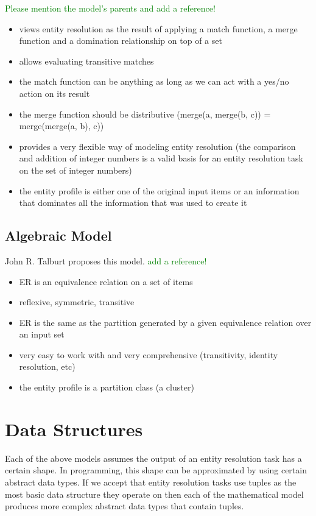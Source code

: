 \documentclass[11pt]{article}
\begin{document}
    \textcolor{green}{Please mention the model's parents and add a reference!}
    \begin{itemize}
        \item views entity resolution as the result of applying a match function, a merge function and a domination relationship on top of a set
        \item allows evaluating transitive matches
        \item the match function can be anything as long as we can act with a yes/no action on its result
        \item the merge function should be distributive (merge(a, merge(b, c)) = merge(merge(a, b), c))
        \item provides a very flexible way of modeling entity resolution (the comparison and addition of integer numbers is a valid basis for an entity resolution task on the set of integer numbers)
        \item the entity profile is either one of the original input items or an information that dominates all the information that was used to create it
    \end{itemize}

    \subsection[algebraic]{Algebraic Model}\label{subsec:algebraic}

    John R. Talburt proposes this model. 
    \textcolor{green}{add a reference!}
    \begin{itemize}
        \item ER is an equivalence relation on a set of items
        \item reflexive, symmetric, transitive
        \item ER is the same as the partition generated by a given equivalence relation over an input set
        \item very easy to work with and very comprehensive (transitivity, identity resolution, etc)
        \item the entity profile is a partition class (a cluster)
    \end{itemize}

    \section{Data Structures}\label{section:data-structures}

    Each of the above models assumes the output of an entity resolution task has a certain shape. In programming, this shape can be approximated by using certain abstract data types. If we accept that entity resolution tasks use tuples as the most basic data structure they operate on then each of the mathematical model produces more complex abstract data types that contain tuples.
\end{document}

